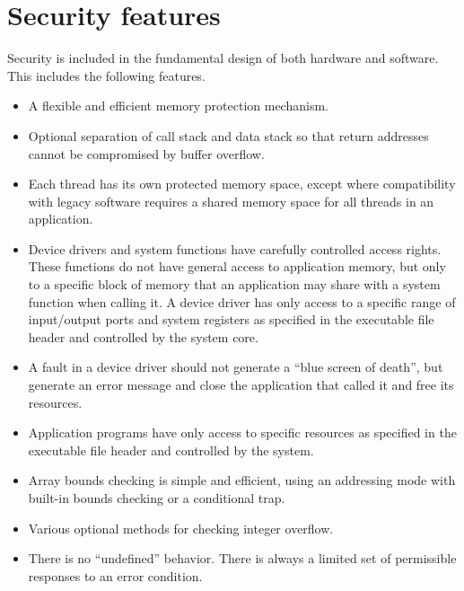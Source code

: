 \documentclass[forwardcom.tex]{subfiles}
\begin{document}
\section{Security features} \label{securityFeatures}
Security is included in the fundamental design of both hardware and software. This includes the following features.

\begin{itemize}
\item A flexible and efficient memory protection mechanism.

\item Optional separation of call stack and data stack so that return addresses cannot be compromised by buffer overflow.

\item Each thread has its own protected memory space, except where compatibility with legacy 
software requires a shared memory space for all threads in an application.

\item Device drivers and system functions have carefully controlled access rights. These functions do not have general access to application memory, but only to a specific block of memory that an application may share with a system function when calling it. A device driver has only access to a specific range of input/output ports and system registers as specified in the executable file header and controlled by the system core.

\item A fault in a device driver should not generate a ``blue screen of death'', but generate an error message and close the application that called it and free its resources.

\item Application programs have only access to specific resources as specified in the executable file header and controlled by the system.

\item Array bounds checking is simple and efficient, using an addressing mode with built-in bounds checking or a conditional trap.

\item Various optional methods for checking integer overflow.

\item There is no ``undefined'' behavior. There is always a limited set of permissible responses to an error condition.
\end{itemize}
\end{document}
